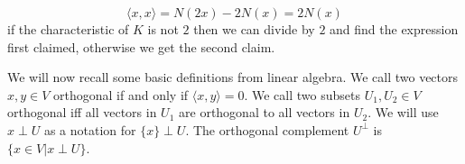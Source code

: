 \documentclass[../Thesis.tex]{subfiles}
\begin{document}
\begin{myproof}
\begin{equation}
\langle x, x \rangle = N(2x)- 2N(x) = 2N(x)
\end{equation}
if the characteristic of $K$ is not $2$ then we can divide by $2$ and find the expression first claimed, otherwise we get the second claim.
\end{myproof}

We will now recall some basic definitions from linear algebra. We call two vectors $x,y \in V$ orthogonal if and only if $\langle x,y \rangle =0$. We call two subsets $U_1, U_2 \in V$ orthogonal iff all vectors in $U_1$ are orthogonal to all vectors in $U_2$. We will use $x \perp U$ as a notation for $\{x\} \perp U$. The orthogonal complement $U^\perp$ is $\{ x \in V| x \perp U\}$.
\end{document}
